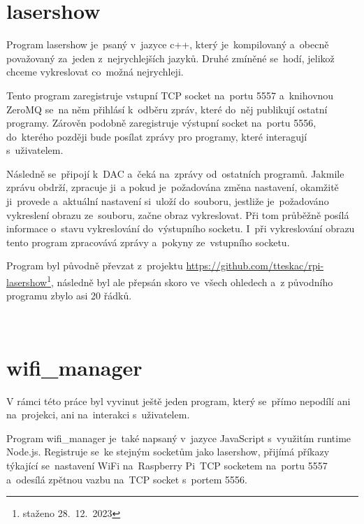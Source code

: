 \section{lasershow}

Program lasershow je~psaný v~jazyce c++, který je~kompilovaný a~obecně považovaný za~jeden z~nejrychlejších jazyků. Druhé zmíněné se~hodí, jelikož chceme vykreslovat co~možná nejrychleji.

Tento program zaregistruje vstupní TCP socket na~portu 5557 a~knihovnou ZeroMQ se~na něm přihlásí k~odběru zpráv, které do~něj publikují ostatní programy. Zárověn podobně zaregistruje výstupní socket na~portu 5556, do~kterého později bude posílat zprávy pro programy, které interagují s~uživatelem.

Následně se~připojí k~DAC a~čeká na~zprávy od~ostatních programů. Jakmile zprávu obdrží, zpracuje ji~a pokud je~požadována změna nastavení, okamžitě ji~provede a~aktuální nastavení si~uloží do~souboru, jestliže je~požadováno vykreslení obrazu ze~souboru, začne obraz vykreslovat. Při tom průběžně posílá informace o~stavu vykreslování do~výstupního socketu. I~při vykreslování obrazu tento program zpracovává zprávy a~pokyny ze~vstupního socketu.

Program byl původně převzat z~projektu \url{https://github.com/tteskac/rpi-lasershow}\footnote{staženo 28.~12.~2023}, následně byl ale přepsán skoro ve~všech ohledech a~z původního programu zbylo asi 20 řádků.


\






\section{wifi\_manager}

V rámci této práce byl vyvinut ještě jeden program, který se~přímo nepodílí ani na~projekci, ani na~interakci s~uživatelem.

Program wifi\_manager je~také napsaný v~jazyce JavaScript s~využitím runtime Node.js. Registruje se~ke stejným socketům jako lasershow, přijímá příkazy týkající se~nastavení WiFi na~Raspberry Pi~TCP socketem na~portu 5557 a~odesílá zpětnou vazbu na~TCP socket s~portem 5556.

